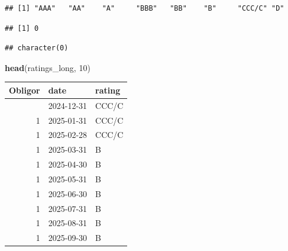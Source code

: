 \documentclass[
  11pt,
]{article}
\newenvironment{Shaded}{\begin{snugshade}}{\end{snugshade}}
\newcommand{\DecValTok}[1]{\textcolor[rgb]{0.00,0.00,0.81}{#1}}
\newcommand{\FunctionTok}[1]{\textcolor[rgb]{0.13,0.29,0.53}{\textbf{#1}}}
\newcommand{\NormalTok}[1]{#1}
\newcommand{\SpecialCharTok}[1]{\textcolor[rgb]{0.81,0.36,0.00}{\textbf{#1}}}
\newcounter{none} %
\begin{document}
\begin{verbatim}
## [1] "AAA"   "AA"    "A"     "BBB"   "BB"    "B"     "CCC/C" "D"
\end{verbatim}

\begin{Shaded}
\end{Shaded}

\begin{verbatim}
## [1] 0
\end{verbatim}

\begin{Shaded}
\end{Shaded}

\begin{verbatim}
## character(0)
\end{verbatim}

\begin{Shaded}
\begin{Highlighting}[]
\FunctionTok{head}\NormalTok{(ratings\_long, }\DecValTok{10}\NormalTok{)}
\end{Highlighting}
\end{Shaded}

{\def\LTcaptype{none} %
\begin{longtable}[]{@{}rll@{}}
\toprule\noalign{}
Obligor & date & rating \\
\midrule\noalign{}
\endhead
\bottomrule\noalign{}
\endlastfoot
1 & 2024-12-31 & CCC/C \\
1 & 2025-01-31 & CCC/C \\
1 & 2025-02-28 & CCC/C \\
1 & 2025-03-31 & B \\
1 & 2025-04-30 & B \\
1 & 2025-05-31 & B \\
1 & 2025-06-30 & B \\
1 & 2025-07-31 & B \\
1 & 2025-08-31 & B \\
1 & 2025-09-30 & B \\
\end{longtable}
}
\end{document}
